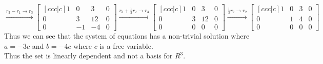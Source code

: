 \documentclass{article}
\begin{document}
$$ \xrightarrow{r_3 - r_1 \rightarrow r_3} \begin{bmatrix}[ccc|c]
    1 & 0 & 3 & 0\\
    0 & 3 & 12 & 0\\
    0 & -1 & -4 & 0
\end{bmatrix} \xrightarrow{r_3 + \frac{1}{3}r_2 \rightarrow r_3} \begin{bmatrix}[ccc|c]
    1 & 0 & 3 & 0\\
    0 & 3 & 12 & 0\\
    0 & 0 & 0 & 0
\end{bmatrix} \xrightarrow{\frac{1}{3}r_2 \rightarrow r_2} \begin{bmatrix}[ccc|c]
    1 & 0 & 3 & 0\\
    0 & 1 & 4 & 0\\
    0 & 0 & 0 & 0
\end{bmatrix} $$
Thus we can see that the system of equations has a non-trivial solution where $a = -3c$ and $b = -4c$ where $c$ is a free variable.\\
Thus the set is linearly dependent and not a basis for $R^3$.
\end{document}
